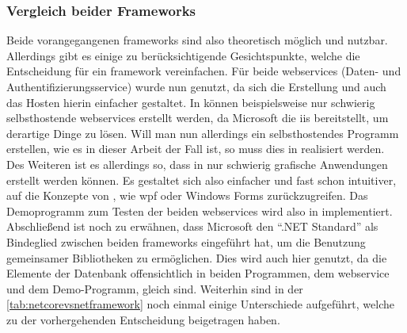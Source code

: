 	\subsubsection{Vergleich beider Frameworks}\label{subsubsec:vergleich-beider-frameworks}
		Beide vorangegangenen \glspl{framework} sind also theoretisch möglich und nutzbar.
		Allerdings gibt es einige zu berücksichtigende Gesichtspunkte,
		welche die Entscheidung für ein \gls{framework} vereinfachen.
		Für beide \glspl{webservice} (Daten- und Authentifizierungsservice) wurde nun  genutzt,
		da sich die Erstellung und auch das Hosten hierin einfacher gestaltet.
		In  können beispielsweise nur schwierig selbsthostende \glspl{webservice} erstellt werden,
		da Microsoft die \gls{iis} bereitstellt,
		um derartige Dinge zu lösen.
		Will man nun allerdings ein selbsthostendes Programm erstellen,
		wie es in dieser Arbeit der Fall ist,
		so muss dies in  realisiert werden.
		Des Weiteren ist es allerdings so,
		dass in  nur schwierig grafische Anwendungen erstellt werden können.
		Es gestaltet sich also einfacher und fast schon intuitiver,
		auf die Konzepte von ,
		wie \gls{wpf} oder Windows Forms zurückzugreifen.
		Das Demoprogramm zum Testen der beiden \glspl{webservice} wird also in  implementiert.
		Abschließend ist noch zu erwähnen,
		dass Microsoft den \enquote{.NET Standard} als Bindeglied zwischen beiden \glspl{framework} eingeführt hat,
		um die Benutzung gemeinsamer Bibliotheken zu ermöglichen.
		Dies wird auch hier genutzt,
		da die Elemente der Datenbank offensichtlich in beiden Programmen,
		dem \gls{webservice}
		und dem Demo-Programm,
		gleich sind.
		Weiterhin sind in der \vref{tab:netcorevsnetframework} noch einmal einige Unterschiede aufgeführt,
		welche zu der vorhergehenden Entscheidung beigetragen haben.